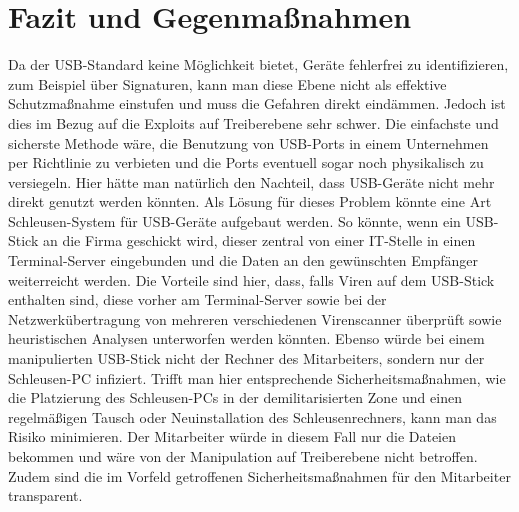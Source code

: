 \chapter{Fazit und Gegenmaßnahmen}
Da der USB-Standard keine Möglichkeit bietet, Geräte fehlerfrei zu identifizieren, zum Beispiel über Signaturen, kann man diese Ebene nicht als effektive Schutzmaßnahme einstufen und muss die Gefahren direkt eindämmen. Jedoch ist dies im Bezug auf die Exploits auf Treiberebene sehr schwer. Die einfachste und sicherste Methode wäre, die Benutzung von USB-Ports in einem Unternehmen per Richtlinie zu verbieten und die Ports eventuell sogar noch physikalisch zu versiegeln. Hier hätte man natürlich den Nachteil, dass USB-Geräte nicht mehr direkt genutzt werden könnten. Als Lösung für dieses Problem könnte eine Art Schleusen-System für USB-Geräte aufgebaut werden. So könnte, wenn ein USB-Stick an die Firma geschickt wird, dieser zentral von einer IT-Stelle in einen Terminal-Server eingebunden und die Daten an den gewünschten Empfänger weiterreicht werden. Die Vorteile sind hier, dass, falls Viren auf dem USB-Stick enthalten sind, diese vorher am Terminal-Server sowie bei der Netzwerkübertragung von mehreren verschiedenen Virenscanner überprüft sowie heuristischen Analysen unterworfen werden könnten. Ebenso würde bei einem manipulierten USB-Stick nicht der Rechner des Mitarbeiters, sondern nur der Schleusen-PC infiziert. Trifft man hier entsprechende Sicherheitsmaßnahmen, wie die Platzierung des Schleusen-PCs in der demilitarisierten Zone und einen regelmäßigen Tausch oder Neuinstallation des Schleusenrechners, kann man das Risiko minimieren. Der Mitarbeiter würde in diesem Fall nur die Dateien bekommen und wäre von der Manipulation auf Treiberebene nicht betroffen. Zudem sind die im Vorfeld getroffenen Sicherheitsmaßnahmen für den Mitarbeiter transparent.